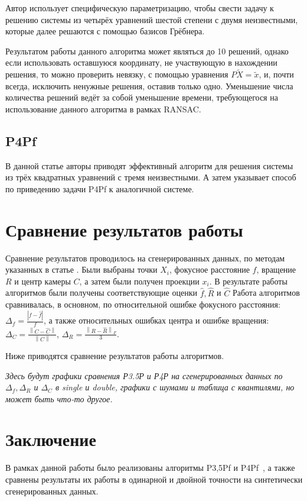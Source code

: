 \documentclass[%
bachelor,    %
natbib,      %
subf,        %
href,        %
colorlinks,  %
]{disser}
\begin{document}
    Автор использует специфическую параметризацию, чтобы свести задачу к решению системы из четырёх уравнений шестой степени с двумя неизвестными, которые далее решаются с помощью базисов Грёбнера.
    
    Результатом работы данного алгоритма может являться до 10 решений, однако если использовать оставшуюся координату, не участвующую в нахождении решения, то можно проверить невязку, с помощью уравнения $P\widetilde X = \widetilde x$, и, почти всегда, исключить ненужные решения, оставив только одно. Уменьшение числа количества решений ведёт за собой уменьшение времени, требующегося на использование данного алгоритма в рамках RANSAC.
    
\subsection{P4Pf}

В данной статье \cite{p4p} авторы приводят эффективный алгоритм для решения системы из трёх квадратных уравнений с тремя неизвестными.
А затем указывает способ по приведению задачи P4Pf к аналогичной системе.


\clearpage\section{Сравнение результатов работы}

Сравнение результатов проводилось на сгенерированных данных, по методам указанных в статье \cite{p35p}. Были выбраны точки $X_i$, фокусное расстояние $f$, вращение $R$ и центр камеры $C$, а затем были получен проекции $x_i$.
В результате работы алгоритмов были получены соответствующие оценки $\hat f, \hat R$ и $\hat C$  Работа алгоритмов сравнивалась,  в основном, по относительной ошибке фокусного расстояния: $\Delta_f=\frac{\left\lvert f - \hat{f}\right\rvert}{f}$, а также относительных ошибках центра  и ошибке вращения: $\Delta_C = \frac{\left\lVert C - \hat{C}\right\rVert}{\left\lVert C\right\rVert}$, $\Delta_R = \frac{\left\lVert R - \hat{R}\right\rVert_F}{3}$.

Ниже приводятся сравнение результатов работы алгоритмов.

\textit{Здесь будут графики сравнения Р3.5Р и Р4Р на сгенерированных данных по $\Delta_f, \Delta_R$ и $\Delta_C$ в single и double, графики с шумами и таблица с квантилями, но может быть что-то другое.}



\clearpage\section{Заключение}
В рамках данной работы было реализованы алгоритмы P3,5Pf \cite{p35p} и P4Pf~\cite{p4p}, а также сравнены результаты их работы в одинарной и двойной точности на синтетически сгенерированных данных.

\newpage
\def\thispagestyle#1{} %


\end{document}
